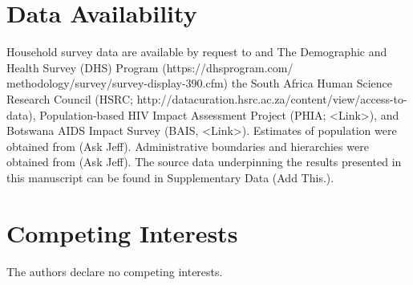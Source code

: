 \documentclass{article}
\begin{document}

\section*{Data Availability}


Household survey data are available by request to and The Demographic and Health Survey (DHS) Program (https://dhsprogram.com/ methodology/survey/survey-display-390.cfm) the South Africa Human Science Research Council (HSRC; http://datacuration.hsrc.ac.za/content/view/access-to-data), Population-based HIV Impact Assessment Project (PHIA; <Link>), and Botswana AIDS Impact Survey (BAIS, <Link>). Estimates of population were obtained from {\color{red}(Ask Jeff)}. Administrative boundaries and hierarchies were obtained from {\color{red}(Ask Jeff)}. The source data underpinning the results presented in this manuscript can be found in Supplementary Data {\color{red}(Add This.)}.


\section*{Competing Interests}


The authors declare no competing interests.
\end{document}
